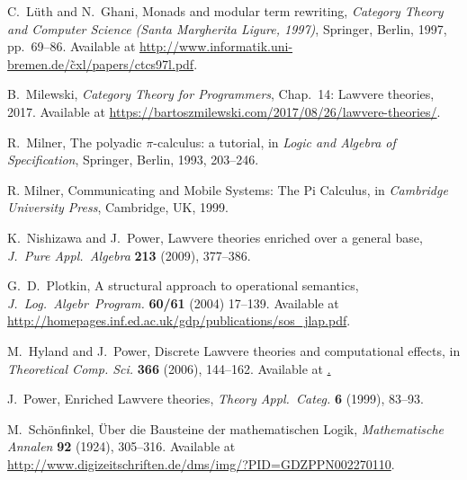 \documentclass{amsart}
\theoremstyle{definition}
\begin{document}
\begin{thebibliography}{100}
 C.\ L\"{u}th and N.\ Ghani, Monads and modular term rewriting,
\textsl{Category Theory and Computer Science ({S}anta {M}argherita Ligure, 1997)}, Springer, Berlin, 1997, pp.\ 69--86.  Available at \href{http://www.informatik.uni-bremen.de/~cxl/papers/ctcs97l.pdf}{http://www.informatik.uni-bremen.de/\~cxl/papers/ctcs97l.pdf}.



 B.\ Milewski, \textsl{Category Theory for Programmers}, Chap.\ 14: Lawvere theories, 2017.   Available at \href{https://bartoszmilewskiski.com/2017/08/26/lawvere-theories/}{https://bartoszmilewski.com/2017/08/26/lawvere-theories/}.

 R.\ Milner, The polyadic {$\pi$}-calculus: a tutorial, in \textsl{Logic and Algebra of Specification}, Springer, Berlin, 1993, 203--246.

 R. Milner, Communicating and Mobile Systems: The Pi Calculus, in \textsl{Cambridge University Press}, Cambridge, UK, 1999.

 K.\ Nishizawa and J.\ Power, Lawvere theories enriched over a general base, \textsl{J.\ Pure Appl.\ Algebra}  \textbf{213} (2009), 377--386.

 G.\ D.\ Plotkin, A structural approach to operational semantics, \textsl{J.\ Log.\ Algebr\ Program.} \textbf{60/61} (2004) 17--139.  Available at \href{http://homepages.inf.ed.ac.uk/gdp/publications/sos_jlap.pdf}{http://homepages.inf.ed.ac.uk/gdp/publications/sos\_jlap.pdf}.

 M.\ Hyland and J.\ Power, Discrete Lawvere theories and computational effects, in \textsl{Theoretical Comp.
Sci.} \textbf{366} (2006), 144--162. Available at \href{https://core.ac.uk/download/pdf/81105779.pdf}.
  
 J.\ Power, Enriched Lawvere theories, \textsl{Theory Appl.\ Categ.}  \textbf{6} (1999), 83--93.

 M.\ Sch\"{o}nfinkel, \"Uber die Bausteine der mathematischen Logik, 
 \textsl{Mathematische Annalen} \textbf{92} (1924), 305--316.  Available at \href{http://www.digizeitschriften.de/dms/img/?PID=GDZPPN002270110}{http://www.digizeitschriften.de/dms/img/?PID=GDZPPN002270110}.


\end{thebibliography}
\end{document}
